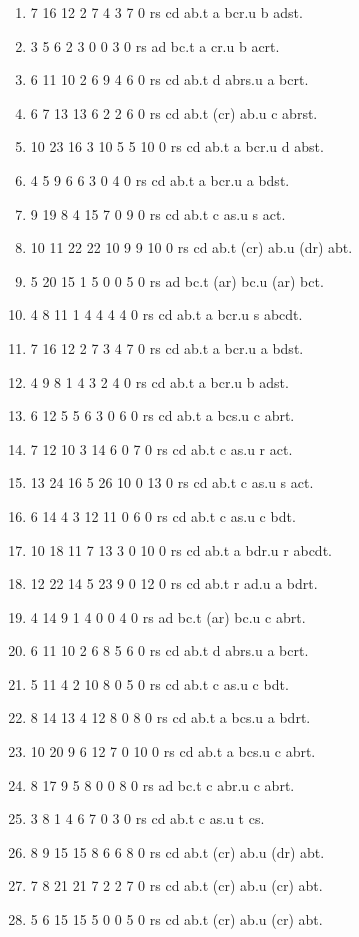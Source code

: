 \documentclass[10pt,journal]{IEEEtran}
\begin{document}
\begin{enumerate}
\item 7 16 12 2 7 4 3 7 0 rs cd ab.t a bcr.u b adst.
\item 3 5 6 2 3 0 0 3 0 rs ad bc.t a cr.u b acrt.
\item 6 11 10 2 6 9 4 6 0 rs cd ab.t d abrs.u a bcrt.
\item 6 7 13 13 6 2 2 6 0 rs cd ab.t (cr) ab.u c abrst.
\item 10 23 16 3 10 5 5 10 0 rs cd ab.t a bcr.u d abst.
\item 4 5 9 6 6 3 0 4 0 rs cd ab.t a bcr.u a bdst.
\item 9 19 8 4 15 7 0 9 0 rs cd ab.t c as.u s act.
\item 10 11 22 22 10 9 9 10 0 rs cd ab.t (cr) ab.u (dr) abt.
\item 5 20 15 1 5 0 0 5 0 rs ad bc.t (ar) bc.u (ar) bct.
\item 4 8 11 1 4 4 4 4 0 rs cd ab.t a bcr.u s abcdt.
\item 7 16 12 2 7 3 4 7 0 rs cd ab.t a bcr.u a bdst.
\item 4 9 8 1 4 3 2 4 0 rs cd ab.t a bcr.u b adst.
\item 6 12 5 5 6 3 0 6 0 rs cd ab.t a bcs.u c abrt.
\item 7 12 10 3 14 6 0 7 0 rs cd ab.t c as.u r act.
\item 13 24 16 5 26 10 0 13 0 rs cd ab.t c as.u s act.
\item 6 14 4 3 12 11 0 6 0 rs cd ab.t c as.u c bdt.
\item 10 18 11 7 13 3 0 10 0 rs cd ab.t a bdr.u r abcdt.
\item 12 22 14 5 23 9 0 12 0 rs cd ab.t r ad.u a bdrt.
\item 4 14 9 1 4 0 0 4 0 rs ad bc.t (ar) bc.u c abrt.
\item 6 11 10 2 6 8 5 6 0 rs cd ab.t d abrs.u a bcrt.
\item 5 11 4 2 10 8 0 5 0 rs cd ab.t c as.u c bdt.
\item 8 14 13 4 12 8 0 8 0 rs cd ab.t a bcs.u a bdrt.
\item 10 20 9 6 12 7 0 10 0 rs cd ab.t a bcs.u c abrt.
\item 8 17 9 5 8 0 0 8 0 rs ad bc.t c abr.u c abrt.
\item 3 8 1 4 6 7 0 3 0 rs cd ab.t c as.u t cs.
\item 8 9 15 15 8 6 6 8 0 rs cd ab.t (cr) ab.u (dr) abt.
\item 7 8 21 21 7 2 2 7 0 rs cd ab.t (cr) ab.u (cr) abt.
\item 5 6 15 15 5 0 0 5 0 rs cd ab.t (cr) ab.u (cr) abt.

\end{enumerate}
\end{document}
